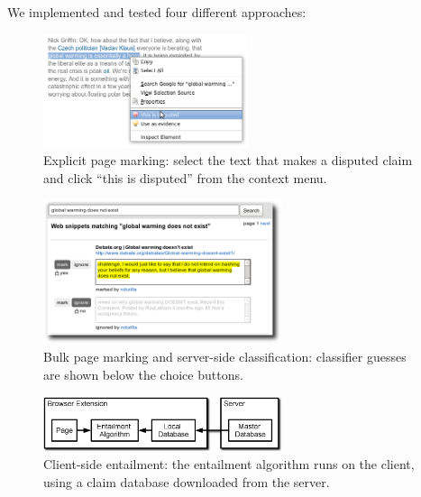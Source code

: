 \documentclass{www2010-submission}
\begin{document}
We implemented and tested four different approaches:

\begin{figure}[tb]
	\begin{center}
	\includegraphics[width=6cm]{pictures/mark_disputed.png}
	\caption{Explicit page marking: select the text that makes a disputed claim and click ``this is disputed'' from the context menu.}
	\label{mark_disputed}
	\end{center}
\end{figure}

\begin{figure}[tb]
	\begin{center}
	\includegraphics[width=7cm]{pictures/training2.png}
	\caption{Bulk page marking and server-side classification: classifier guesses are shown below the choice buttons.}
	\label{training}
	\end{center}
\end{figure}

\begin{figure}[t]
	\begin{center}
	\includegraphics[width=7cm]{pictures/nlp_client_server2.png}
	\caption{Client-side entailment: the entailment algorithm runs on the client, using a claim database downloaded from the server.}
	\label{nlp_client_server}
	\end{center}
\end{figure}
\end{document}
